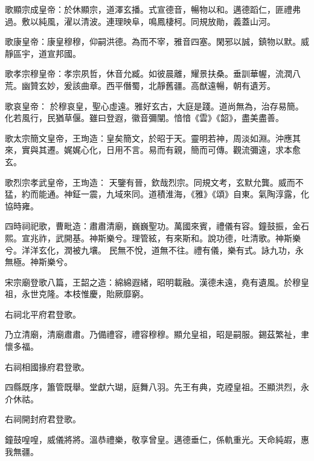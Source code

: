 \begin{pinyinscope}
 歌顯宗成皇帝：於休顯宗，道澤玄播。式宣德音，暢物以和。邁德蹈仁，匪禮弗過。敷以純風，濯以清波。連理映阜，鳴鳳棲柯。同規放勛，義蓋山河。



 歌康皇帝：康皇穆穆，仰嗣洪德。為而不宰，雅音四塞。閑邪以誠，鎮物以默。威靜區宇，道宣邦國。



 歌孝宗穆皇帝：孝宗夙哲，休音允臧。如彼晨離，耀景扶桑。垂訓華幄，流潤八荒。幽贊玄妙，爰該曲章。西平僭蜀，北靜舊疆。高猷遠暢，朝有遺芳。



 歌哀皇帝：
 於穆哀皇，聖心虛遠。雅好玄古，大庭是踐。道尚無為，治存易簡。化若風行，民猶草偃。雖曰登遐，徽音彌闡。愔愔《雲》《韶》，盡美盡善。



 歌太宗簡文皇帝，王珣造：皇矣簡文，於昭于天。靈明若神，周淡如淵。沖應其來，實與其遷。娓娓心化，日用不言。易而有親，簡而可傳。觀流彌遠，求本愈玄。



 歌烈宗孝武皇帝，王珣造：
 天鑒有晉，欽哉烈宗。同規文考，玄默允龔。威而不猛，約而能通。神鉦一震，九域來同。道積淮海，《雅》《頌》自東。氣陶淳露，化協時雍。



 四時祠祀歌，曹毗造：肅肅清廟，巍巍聖功。萬國來賓，禮儀有容。鐘鼓振，金石熙。宣兆祚，武開基。神斯樂兮。理管絃，有來斯和。說功德，吐清歌。神斯樂兮。洋洋玄化，潤被九壤。
 民無不悅，道無不往。禮有儀，樂有式。詠九功，永無極。神斯樂兮。



 宋宗廟登歌八篇，王韶之造：綿綿遐緒，昭明載融。漢德未遠，堯有遺風。於穆皇祖，永世克隆。本枝惟慶，貽厥靡窮。



 右祠北平府君登歌。



 乃立清廟，清廟肅肅。乃備禮容，禮容穆穆。顯允皇祖，昭是嗣服。錫茲繁祉，聿懷多福。



 右祠相國掾府君登歌。



 四縣既序，簫管既舉。堂獻六瑚，庭舞八羽。先王有典，克禋皇祖。丕顯洪烈，永介休祜。



 右祠開封府君登歌。



 鐘鼓喤喤，威儀將將。溫恭禮樂，敬享曾皇。邁德垂仁，係軌重光。天命純嘏，惠我無疆。




\end{pinyinscope}
